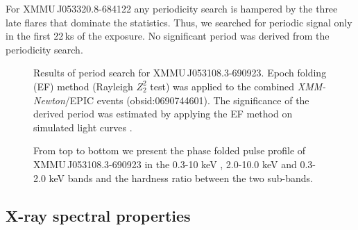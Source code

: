\documentclass[a4paper,fleqn,usenatbib]{mnras}
\newcommand{\xmm}{{\it XMM-Newton}\xspace}
\newcommand{\canda}{XMMU\,J053108.3-690923\xspace} %
\newcommand{\candb}{XMMU\,J053320.8-684122\xspace} %
\begin{document}
For \candb any periodicity search is hampered by the three late flares that dominate the statistics. Thus, we searched for periodic signal only in the first 22\,ks of the exposure. No significant period was derived from the periodicity search.


\begin{figure}
  \caption{Results of period search for \canda. Epoch folding (EF) method (Rayleigh $Z^2_2$ test) was applied to the combined \xmm/EPIC events (obsid:0690744601). 
  The significance of the derived period was estimated by applying the EF method on simulated light curves \citep{1995A&A...300..707T,2013MNRAS.433..907E}.}
   
  \label{fig:EF601}
\end{figure}

\begin{figure}
  \caption{From top to bottom we present the phase folded pulse profile of \canda  in the 0.3-10 keV , 2.0-10.0 keV  and 0.3-2.0 keV bands and the hardness ratio between the two sub-bands.} 
  \label{fig:pp}
\end{figure}

\subsection{X-ray spectral properties}
\label{sec-spec_an}
\end{document}
